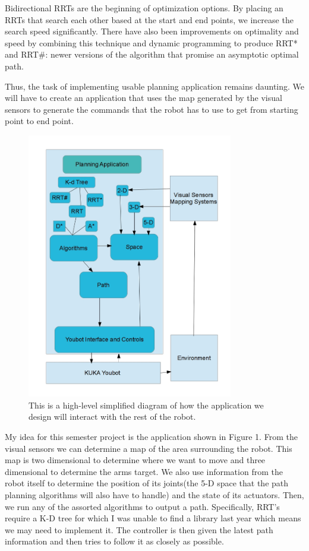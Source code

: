 \documentclass[twocolumn]{article}
\begin{document}
Bidirectional RRTs are the beginning of optimization options. By placing an RRTs that search each other based at the start and end points, we increase the search speed significantly. There have also been improvements on optimality and speed by combining this technique and dynamic programming to produce RRT* and RRT#: newer versions of the algorithm that promise an asymptotic optimal path. 

Thus, the task of implementing usable planning application remains daunting. We will have to create an application that uses the map generated by the visual sensors to generate the commands that the robot has to use to get from starting point to end point. 

\begin{figure}[ht!]
\centering
\includegraphics[width=90mm]{Simple Application Diagram.jpg}
\caption{This is a high-level simplified diagram of how the application we design will interact with the rest of the robot.}
\label{Planning Application}
\end{figure}

My idea for this semester project is the application shown in Figure 1. From the visual sensors we can determine a map of the area surrounding the robot. This map is two dimensional to determine where we want to move and three dimensional to determine the arms target. We also use information from the robot itself to determine the position of its joints(the 5-D space that the path planning algorithms will also have to handle) and the state of its actuators. Then, we run any of the assorted algorithms to output a path. Specifically, RRT's require a K-D tree for which I was unable to find a library last year which means we may need to implement it. The controller is then given the latest path information and then tries to follow it as closely as possible.
\end{document}
